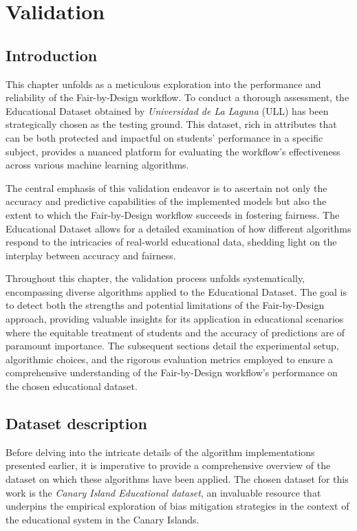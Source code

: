 \chapter{Validation}
\label{chap:validation}

\section{Introduction}
This chapter unfolds as a meticulous exploration into the performance and reliability of the Fair-by-Design workflow. To conduct a thorough assessment, the Educational Dataset obtained by \emph{Universidad de La Laguna} (ULL) has been strategically chosen as the testing ground. This dataset, rich in attributes that can be both protected and impactful on students' performance in a specific subject, provides a nuanced platform for evaluating the workflow's effectiveness across various machine learning algorithms.

The central emphasis of this validation endeavor is to ascertain not only the accuracy and predictive capabilities of the implemented models but also the extent to which the Fair-by-Design workflow succeeds in fostering fairness. The Educational Dataset allows for a detailed examination of how different algorithms respond to the intricacies of real-world educational data, shedding light on the interplay between accuracy and fairness.

Throughout this chapter, the validation process unfolds systematically, encompassing diverse algorithms applied to the Educational Dataset. The goal is to detect both the strengths and potential limitations of the Fair-by-Design approach, providing valuable insights for its application in educational scenarios where the equitable treatment of students and the accuracy of predictions are of paramount importance. The subsequent sections detail the experimental setup, algorithmic choices, and the rigorous evaluation metrics employed to ensure a comprehensive understanding of the Fair-by-Design workflow's performance on the chosen educational dataset.

\section{Dataset description}

Before delving into the intricate details of the algorithm implementations presented earlier, it is imperative to provide a comprehensive overview of the dataset on which these algorithms have been applied. The chosen dataset for this work is the \emph{Canary Island Educational dataset}, an invaluable resource that underpins the empirical exploration of bias mitigation strategies in the context of the educational system in the Canary Islands. 

